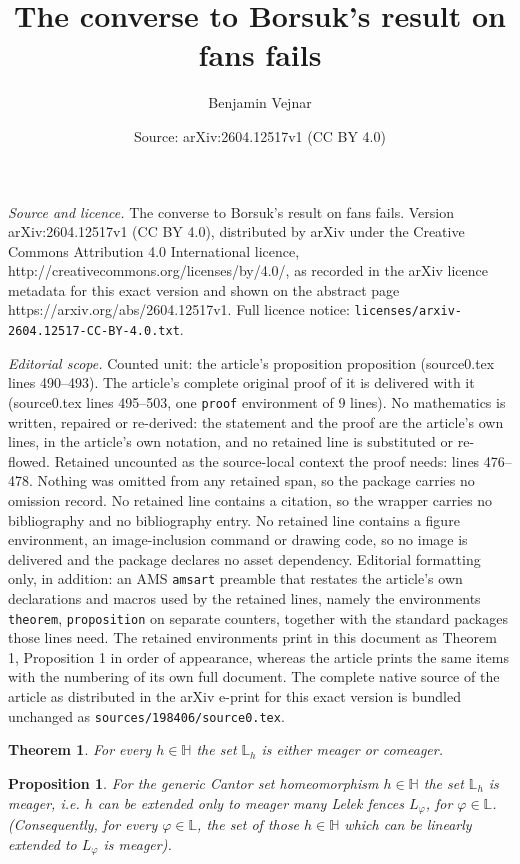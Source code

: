 \documentclass[10pt,a4paper]{amsart}
\title{The converse to Borsuk’s result on fans fails}
\author{Benjamin Vejnar}
\date{Source: arXiv:2604.12517v1 (CC BY 4.0)}
\newtheorem{theorem}{Theorem}
\newtheorem{proposition}{Proposition}
\begin{document}
\maketitle

\noindent\emph{Source and licence.} The converse to Borsuk’s result on fans fails. Version arXiv:2604.12517v1 (CC BY 4.0), distributed by arXiv under the Creative Commons Attribution 4.0 International licence, http://creativecommons.org/licenses/by/4.0/, as recorded in the arXiv licence metadata for this exact version and shown on the abstract page https://arxiv.org/abs/2604.12517v1. Full licence notice: \texttt{licenses/arxiv-2604.12517-CC-BY-4.0.txt}.\par\smallskip

\noindent\textit{Editorial scope.} Counted unit: the article's proposition proposition (source0.tex lines 490--493). The article's complete original proof of it is delivered with it (source0.tex lines 495--503, one \texttt{proof} environment of 9 lines). No mathematics is written, repaired or re-derived: the statement and the proof are the article's own lines, in the article's own notation, and no retained line is substituted or re-flowed.  Retained uncounted as the source-local context the proof needs: lines 476--478.  Nothing was omitted from any retained span, so the package carries no omission record.  No retained line contains a citation, so the wrapper carries no bibliography and no bibliography entry.  No retained line contains a figure environment, an image-inclusion command or drawing code, so no image is delivered and the package declares no asset dependency.  Editorial formatting only, in addition: an AMS \texttt{amsart} preamble that restates the article's own declarations and macros used by the retained lines, namely the environments \texttt{theorem}, \texttt{proposition} on separate counters, together with the standard packages those lines need.  The retained environments print in this document as Theorem 1, Proposition 1 in order of appearance, whereas the article prints the same items with the numbering of its own full document.  The complete native source of the article as distributed in the arXiv e-print for this exact version is bundled unchanged as \texttt{sources/198406/source0.tex}.
\begin{theorem}\label{TheoremZeroOneLaw}
For every $h\in\mathbb H$ the set $\mathbb L_h$ is either meager or comeager.
\end{theorem}

\begin{proposition}
For the generic Cantor set homeomorphism $h\in\mathbb H$ the set $\mathbb L_h$ is meager, i.e. $h$ can be extended only to meager many Lelek fences $L_\varphi$, for $\varphi\in\mathbb L$.
(Consequently, for every $\varphi\in\mathbb L$, the set of those $h\in\mathbb H$ which can be linearly extended to $L_\varphi$ is meager).
\end{proposition}
\end{document}
